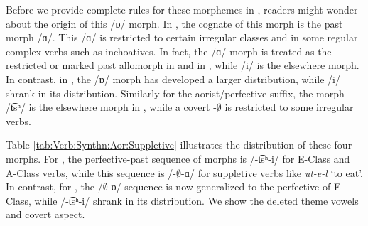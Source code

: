 Before we provide complete rules for these morphemes in {\iaIA}, readers might wonder about the origin of this /{ɒ}/ morph. In {\seaSE}, the cognate of this morph is the past morph /{ɑ}/. This /{ɑ}/ is restricted to certain irregular classes and in some regular complex verbs such as inchoatives. In fact, the /{ɑ}/ morph is treated as the restricted or marked past allomorph in {\seaSE} and in {\swaWA} \citep{DolatianGuekguezian-prep-TierBasedLocalityArmenianConjugationClass,KarakasDolatainGuekguezian-prep-DisentanglingTesnseAgreementWesternArmenian}, while /{i}/ is the elsewhere morph. In contrast, in {\iaIA}, the /{ɒ}/ morph has developed a larger distribution, while /{i}/ shrank in its distribution. Similarly for the aorist/perfective suffix, the morph /{t͡sʰ}/ is the elsewhere morph in {\seaSE}, while a covert -$\emptyset$ is restricted to some irregular verbs. 

Table \ref{tab:Verb:Synthn:Aor:Suppletive} illustrates the distribution of these four morphs. For {\seaSE}, the perfective-past sequence of morphs is /{-t͡sʰ-i}/ for E-Class and A-Class verbs, while this sequence is /{-$\emptyset$-ɑ}/ for suppletive verbs like \textit{{ut-e-l}} `to eat'. In contrast, for {\iaIA}, the /{$\emptyset$-ɒ}/ sequence is now generalized to the perfective of E-Class, while /{-t͡sʰ-i}/ shrank in its distribution. We show the deleted theme vowels and covert aspect.

